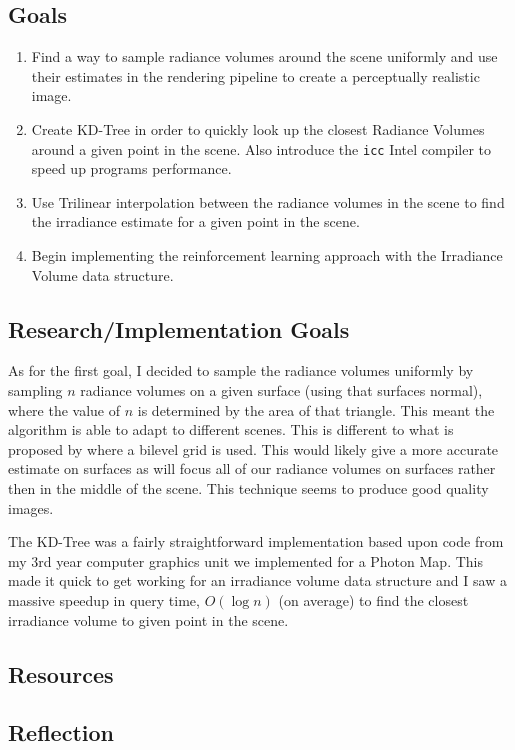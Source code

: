 \documentclass[conference]{IEEEtran}
\begin{document}
\subsection{Goals}
\begin{enumerate}
\item Find a way to sample radiance volumes around the scene uniformly and use their estimates in the rendering pipeline to create a perceptually realistic image.
\item Create KD-Tree in order to quickly look up the closest Radiance Volumes around a given point in the scene. Also introduce the \verb|icc| Intel compiler to speed up programs performance.
\item Use Trilinear interpolation between the radiance volumes in the scene to find the irradiance estimate for a given point in the scene.
\item Begin implementing the reinforcement learning approach with the Irradiance Volume data structure.
\end{enumerate}

\subsection{Research/Implementation Goals}
As for the first goal, I decided to sample the radiance volumes uniformly by sampling $n$ radiance volumes on a given surface (using that surfaces normal), where the value of $n$ is determined by the area of that triangle. This meant the algorithm is able to adapt to different scenes. This is different to what is proposed by \cite{greger1998irradiance} where a bilevel grid is used. This would likely give a more accurate estimate on surfaces as will focus all of our radiance volumes on surfaces rather then in the middle of the scene. This technique seems to produce good quality images.

The KD-Tree was a fairly straightforward implementation based upon code from my 3rd year computer graphics unit we implemented for a Photon Map. This made it quick to get working for an irradiance volume data structure and I saw a massive speedup in query time, $O(\log{n})$ (on average) to find the closest irradiance volume to given point in the scene.

\subsection{Resources}

\subsection{Reflection}




\end{document}
